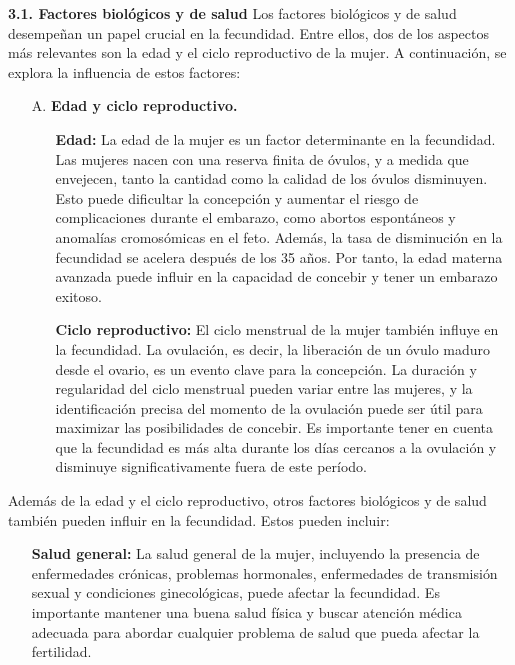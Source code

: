 \documentclass[8pt,a4paper]{beamer}
\begin{document}
{\begin{frame}{}
\begin{block}{\textbf{3.1. Factores biológicos y de salud}}
\setlength{\parskip}{3px}
\justifying
Los factores biológicos y de salud desempeñan un papel crucial en la fecundidad. Entre ellos, dos de los aspectos más relevantes son la edad y el ciclo reproductivo de la mujer. A continuación, se explora la influencia de estos factores:
\begin{enumerate}
\setlength{\parskip}{3px}
\justifying
\item[A.] \textbf{Edad y ciclo reproductivo.}
\begin{enumerate}
\setlength{\parskip}{3px}
\justifying
\item[\ding{99}] \textbf{Edad:} La edad de la mujer es un factor determinante en la fecundidad. Las mujeres nacen con una reserva finita de óvulos, y a medida que envejecen, tanto la cantidad como la calidad de los óvulos disminuyen. Esto puede dificultar la concepción y aumentar el riesgo de complicaciones durante el embarazo, como abortos espontáneos y anomalías cromosómicas en el feto. Además, la tasa de disminución en la fecundidad se acelera después de los 35 años. Por tanto, la edad materna avanzada puede influir en la capacidad de concebir y tener un embarazo exitoso.

\item[\ding{99}] \textbf{Ciclo reproductivo:} El ciclo menstrual de la mujer también influye en la fecundidad. La ovulación, es decir, la liberación de un óvulo maduro desde el ovario, es un evento clave para la concepción. La duración y regularidad del ciclo menstrual pueden variar entre las mujeres, y la identificación precisa del momento de la ovulación puede ser útil para maximizar las posibilidades de concebir. Es importante tener en cuenta que la fecundidad es más alta durante los días cercanos a la ovulación y disminuye significativamente fuera de este período.
\end{enumerate}
\end{enumerate}
\end{block}
\end{frame}

\begin{frame}{}
\begin{block}{}
Además de la edad y el ciclo reproductivo, otros factores biológicos y de salud también pueden influir en la fecundidad. Estos pueden incluir:
\begin{enumerate}
\setlength{\parskip}{3px}
\justifying
\item[\ding{65}] \textbf{Salud general:} La salud general de la mujer, incluyendo la presencia de enfermedades crónicas, problemas hormonales, enfermedades de transmisión sexual y condiciones ginecológicas, puede afectar la fecundidad. Es importante mantener una buena salud física y buscar atención médica adecuada para abordar cualquier problema de salud que pueda afectar la fertilidad.


\end{enumerate}
\end{block}
\end{frame}}
\end{document}
